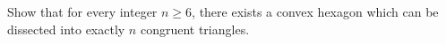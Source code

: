 Show that for every integer $n \geq 6$, there exists a convex hexagon which can be dissected into exactly $n$ congruent triangles.